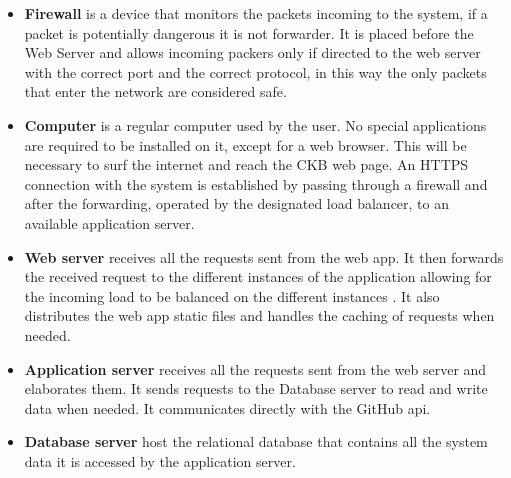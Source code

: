\documentclass{article}
\begin{document}
\begin{itemize}
\item \textbf{Firewall} is a device that monitors the packets incoming to the system, if a packet is potentially dangerous it is not forwarder. It is placed before the Web Server and allows incoming packers only if directed to the web server with the correct port and the correct protocol, in this way the only packets that enter the network are considered safe.
\item \textbf{Computer} is a regular computer used by the user. No special applications are required to be installed on it, except for a web browser. This will be necessary to surf the internet and reach the CKB web page. An HTTPS connection with the system is established by passing through a firewall and after the forwarding, operated by the designated load balancer, to an available application server. 
\item \textbf{Web server} receives all the requests sent from the web app. It then forwards the received request to the different instances of the application allowing for the incoming load to be balanced on the different instances . It also distributes the web app static files and handles the caching of requests when needed.
\item \textbf{Application server} receives all the requests sent from the web server and elaborates them. It sends requests to the Database server to read and write data when needed. It communicates directly with the GitHub api.
\item \textbf{Database server} host the relational database that contains all the system data it is accessed by the application server.
\end{itemize}

\newpage
\end{document}
